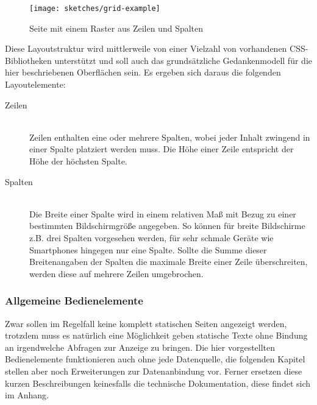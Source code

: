 \begin{figure}[p]
  \texttt{[image: sketches/grid-example]}
  \caption{Seite mit einem Raster aus Zeilen und Spalten}
  \label{fig:grid-example}
\end{figure}

Diese Layoutstruktur wird mittlerweile von einer Vielzahl von vorhandenen CSS-Bibliotheken unterstützt und soll auch das grundsätzliche Gedankenmodell für die hier beschriebenen Oberflächen sein. Es ergeben sich daraus die folgenden Layoutelemente:

\begin{description}
\item[Zeilen] \hfill \\
  Zeilen enthalten eine oder mehrere Spalten, wobei jeder Inhalt zwingend in einer Spalte platziert werden muss. Die Höhe einer Zeile entspricht der Höhe der höchsten Spalte.
\item[Spalten] \hfill \\
  Die Breite einer Spalte wird in einem relativen Maß mit Bezug zu einer bestimmten Bildschirmgröße angegeben. So können für breite Bildschirme z.B. drei Spalten vorgesehen werden, für sehr schmale Geräte wie Smartphones hingegen nur eine Spalte. Sollte die Summe dieser Breitenangaben der Spalten die maximale Breite einer Zeile überschreiten, werden diese auf mehrere Zeilen umgebrochen.
\end{description}


\subsubsection{Allgemeine Bedienelemente}

Zwar sollen im Regelfall keine komplett statischen Seiten angezeigt werden, trotzdem muss es natürlich eine Möglichkeit geben statische Texte ohne Bindung an irgendwelche Abfragen zur Anzeige zu bringen. Die hier vorgestellten Bedienelemente funktionieren auch ohne jede Datenquelle, die folgenden Kapitel stellen aber noch Erweiterungen zur Datenanbindung vor. Ferner ersetzen diese kurzen Beschreibungen keinesfalls die technische Dokumentation, diese findet sich im Anhang.

